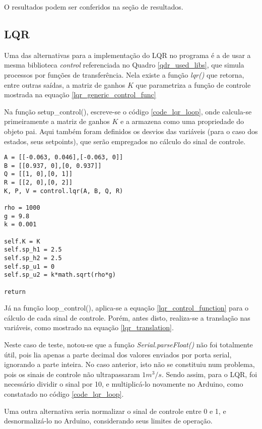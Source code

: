 O resultados podem ser conferidos na seção de resultados.

\subsection{LQR}

Uma das alternativas para a implementação do LQR no programa é a de usar a mesma biblioteca \emph{control} referenciada no Quadro \ref{qdr_used_libs}, que simula processos por funções de transferência. Nela existe a função \emph{lqr()} que retorna, entre outras saídas, a matriz de ganhos $K$ que parametriza a função de controle mostrada na equação \ref{lqr_generic_control_func}

Na função setup\_control(), escreve-se o código \ref{code_lqr_loop}, onde calcula-se primeiramente a matriz de ganhos $K$ e a armazena como uma propriedade do objeto pai. Aqui também foram definidos os desvios das variáveis (para o caso dos estados, seus setpoints), que serão empregados no cálculo do sinal de controle.

\begin{code}
\begin{lstlisting}
A = [[-0.063, 0.046],[-0.063, 0]]
B = [[0.937, 0],[0, 0.937]]
Q = [[1, 0],[0, 1]]
R = [[2, 0],[0, 2]]
K, P, V = control.lqr(A, B, Q, R)

rho = 1000
g = 9.8
k = 0.001

self.K = K
self.sp_h1 = 2.5
self.sp_h2 = 2.5
self.sp_u1 = 0
self.sp_u2 = k*math.sqrt(rho*g)

return
\end{lstlisting}
\label{code_lqr_loop}
\end{code}
Já na função loop\_control(), aplica-se a equação \ref{lqr_control_function} para o cálculo de cada sinal de controle. Porém, antes disto, realiza-se a translação nas variáveis, como mostrado na equação \ref{lqr_translation}.

Neste caso de teste, notou-se que a função \emph{Serial.parseFloat()} não foi totalmente útil, pois lia apenas a parte decimal dos valores enviados por porta serial, ignorando a parte inteira. No caso anterior, isto não se constituiu num problema, pois os sinais de controle não ultrapassaram $1 m^3/s$. Sendo assim, para o LQR, foi necessário dividir o sinal por 10, e multiplicá-lo novamente no Arduino, como constatado no código \ref{code_lqr_loop}.

Uma outra alternativa seria normalizar o sinal de controle entre 0 e 1, e desnormalizá-lo no Arduino, considerando seus limites de operação.

